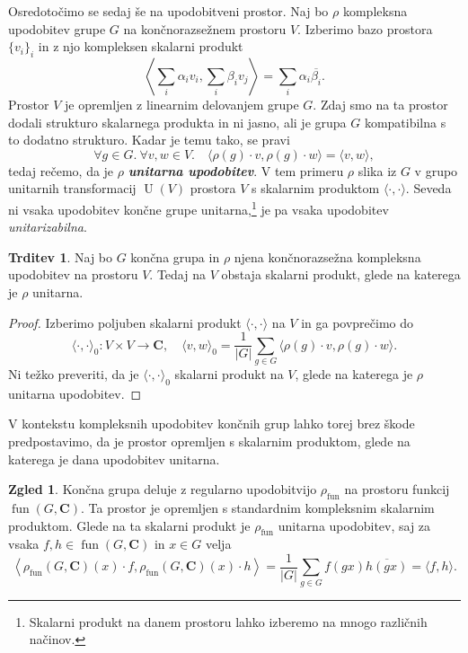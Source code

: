 \documentclass[11pt]{book}
\def\CC{\mathbf{C}}
\DeclareMathOperator\fun{fun}
\DeclareMathOperator\U{U}
\def\definicija{\color{rdeca}\bf\em}
\theoremstyle{definition}
\theoremstyle{zgled}
\newtheorem*{zgled}{Zgled}
\theoremstyle{odprtproblem}
\theoremstyle{domacanaloga}
\newenvironment{dokaz}
    {\color{siva}\begin{proof}}
    {\end{proof}}
\theoremstyle{izrek}
\newtheorem*{trditev}{Trditev}
\begin{document}
Osredotočimo se sedaj še na upodobitveni prostor. Naj bo $\rho$ kompleksna upodobitev grupe $G$ na končnorazsežnem prostoru $V$. Izberimo bazo prostora $\{ v_i \}_{i}$ in z njo kompleksen skalarni produkt
\[
    \left\langle \sum_i \alpha_i v_i, \sum_i \beta_i v_j \right\rangle = \sum_i \alpha_i \overline{\beta_i}.
\]
Prostor $V$ je opremljen z linearnim delovanjem grupe $G$. Zdaj smo na ta prostor dodali strukturo skalarnega produkta in ni jasno, ali je grupa $G$ kompatibilna s to dodatno strukturo. Kadar je temu tako, se pravi
\[
    \forall g \in G. \ \forall v, w \in V. \quad \langle \rho(g) \cdot v, \rho(g) \cdot w \rangle = \langle v, w \rangle,
\]
tedaj rečemo, da je $\rho$ {\definicija unitarna upodobitev}. V tem primeru $\rho$ slika iz $G$ v grupo unitarnih transformacij $\U(V)$ prostora $V$ s skalarnim produktom $\langle \cdot, \cdot \rangle$. Seveda ni vsaka upodobitev končne grupe unitarna,\footnote{Skalarni produkt na danem prostoru lahko izberemo na mnogo različnih načinov.} je pa vsaka upodobitev \emph{unitarizabilna}.

\begin{trditev}
Naj bo $G$ končna grupa in $\rho$ njena končnorazsežna kompleksna upodobitev na prostoru $V$. Tedaj na $V$ obstaja skalarni produkt, glede na katerega je $\rho$ unitarna.
\end{trditev}
\begin{dokaz}
Izberimo poljuben skalarni produkt $\langle \cdot, \cdot \rangle$ na $V$ in ga povprečimo do
\[
    \langle \cdot, \cdot \rangle_0 \colon V \times V \to \CC, \quad
    \langle v, w \rangle_0 = \frac{1}{|G|} \sum_{g \in G} \langle \rho(g) \cdot v, \rho(g) \cdot w \rangle.
\]
Ni težko preveriti, da je $\langle \cdot, \cdot \rangle_0$ skalarni produkt na $V$, glede na katerega je $\rho$ unitarna upodobitev.
\end{dokaz}

V kontekstu kompleksnih upodobitev končnih grup lahko torej brez škode predpostavimo, da je prostor opremljen s skalarnim produktom, glede na katerega je dana upodobitev unitarna.

\begin{zgled}
Končna grupa deluje z regularno upodobitvijo $\rho_{\fun}$ na prostoru funkcij $\fun(G, \CC)$. Ta prostor je opremljen s standardnim kompleksnim skalarnim produktom. Glede na ta skalarni produkt je $\rho_{\fun}$ unitarna upodobitev, saj za vsaka $f,h \in \fun(G,\CC)$ in $x \in G$ velja
\[
    \left\langle \rho_{\fun}(G,\CC)(x) \cdot f, \rho_{\fun}(G,\CC)(x) \cdot h  \right\rangle =
    \frac{1}{|G|} \sum_{g \in G} f(gx) \overline{h(gx)}
    = \langle f, h \rangle.
\]
\end{zgled}
\end{document}
